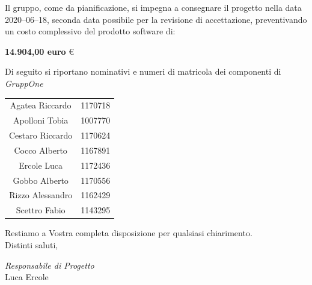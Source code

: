 \documentclass{article}
\begin{document}
Il gruppo, come da pianificazione, si impegna a consegnare il progetto nella data 2020--06--18, seconda data possibile per la revisione di accettazione, preventivando un costo complessivo del prodotto software di:
\begin{center}
  \textbf{14.904,00 euro} €
\end{center}
\newpage
Di seguito si riportano nominativi e numeri di matricola dei componenti di \textit{GruppOne}

\renewcommand{\arraystretch}{2}
\begin{longtable}[H]{c|c}
  \rowcolor{darkgray!90!}
  \color{white}{\textbf{Nominativo}} & \color{white}{\textbf{Matricola}} \\
  \endhead%
  Agatea Riccardo                    & 1170718                           \\
  Apolloni Tobia                     & 1007770                           \\
  Cestaro Riccardo                   & 1170624                           \\
  Cocco Alberto                      & 1167891                           \\
  Ercole Luca                        & 1172436                           \\
  Gobbo Alberto                      & 1170556                           \\
  Rizzo Alessandro                   & 1162429                           \\
  Scettro Fabio                      & 1143295
\end{longtable}

Restiamo a Vostra completa disposizione per qualsiasi chiarimento.\\
Distinti saluti,

\hspace{2cm}
\begin{adjustwidth}{2.5cm}{10.5cm}
  \centering
  \textit{Responsabile di Progetto}\\
  Luca Ercole\
  \hspace{1cm}
  \underline{} %
\end{adjustwidth}
\end{document}
